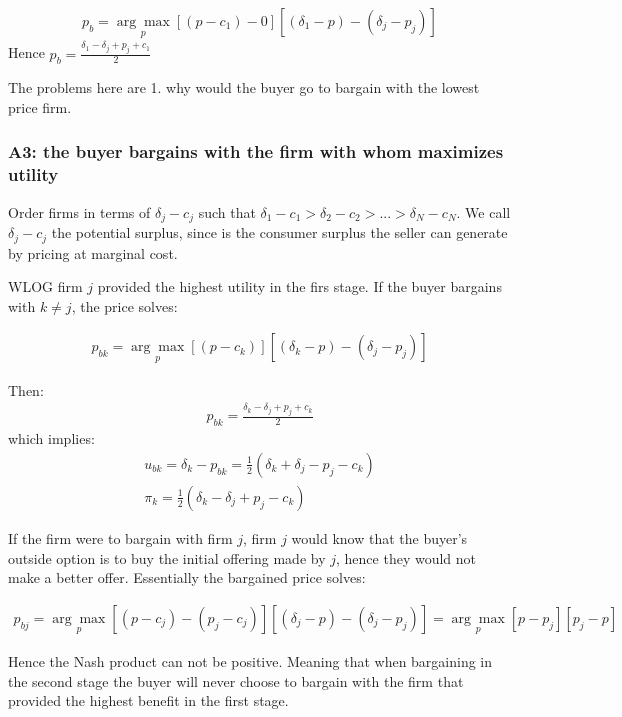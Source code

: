 \documentclass[12pt]{article}
\theoremstyle{plain}
\theoremstyle{plain}
\begin{document}
\begin{align}\label{eq:2}
p_b = \underset{p}{\arg \max} [(p-c_1) - 0 ]  [(\delta_1 - p) - (\delta_j - p_j)] 
\end{align}
Hence $p_b = \frac{\delta_1 - \delta_j + p_j + c_1}{2}$ 

The problems here are 1. why would the buyer go to bargain with the lowest price firm. 


\subsubsection*{A3: the buyer bargains with the firm with whom maximizes utility}\label{sec:A3}

Order firms in terms of $\delta_j - c_j$ such that $\delta_1 - c_1>\delta_2 - c_2>...>\delta_N - c_N$. We call $\delta_j-c_j$ the potential surplus, since is the consumer surplus the seller can generate by pricing at marginal cost.  

WLOG firm $j$ provided the highest utility in the firs stage. If the buyer bargains with $k\neq j$, the price solves: 


\begin{align}\label{eq:3}
p_{bk} = \underset{p}{\arg \max} [(p-c_k) ]  [(\delta_k - p) - (\delta_j - p_j)]  
\end{align}

Then: 
\begin{align*}
p_{bk} = \frac{\delta_k - \delta_j + p_j + c_k}{2}
\end{align*}
which implies: 
\begin{align*}
u_{bk} = \delta_k - p_{bk} 
= \frac{1}{2}(\delta_k + \delta_j - p_j - c_k) \\[1em]
\pi_k = \frac{1}{2}(\delta_k - \delta_j + p_j - c_k)
\end{align*}



If the firm were to bargain with firm $j$, firm $j$  would know that the buyer's outside option is to buy the initial offering made by $j$, hence they would not make a better offer. Essentially the bargained price solves: 

\begin{align}\label{eq:4}
p_{bj} = \underset{p}{\arg \max} [(p-c_j) - (p_j-c_j) ]  [(\delta_j - p) - (\delta_j - p_j)]  = \underset{p}{\arg \max} [p - p_j]  [p_j - p]  
\end{align}

Hence the Nash product can not be positive. Meaning that when bargaining in the second stage the buyer will never choose to bargain with the firm that provided the highest benefit in the first stage. 
\end{document}
